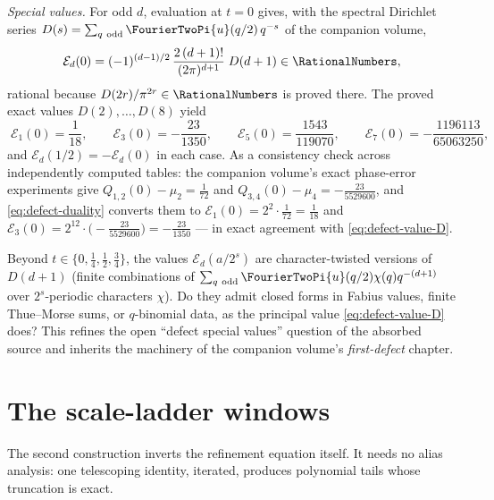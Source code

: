 \documentclass[11pt,oneside]{article}
\numberwithin{equation}{section}
\theoremstyle{definition}
\theoremstyle{remark}
\begin{document}
\emph{Special values.}  For odd $d$, evaluation at $t=0$ gives, with
the spectral Dirichlet series
$D(s)=\sum_{q\ \mathrm{odd}}\FourierTwoPi{u}(q/2)\,q^{-s}$ of the companion
volume,
\begin{equation}
 \mathcal E_d(0)
 =(-1)^{(d-1)/2}\,
 \frac{2\,(d+1)!}{(2\pi)^{d+1}}\;D(d+1)\in\RationalNumbers,
 \label{eq:defect-value-D}
\end{equation}
rational because $D(2r)/\pi^{2r}\in\RationalNumbers$ is proved there.  The proved
exact values $D(2),\dots,D(8)$ yield
\begin{equation}
 \boxed{\;
 \mathcal E_1(0)=\frac1{18},\qquad
 \mathcal E_3(0)=-\frac{23}{1350},\qquad
 \mathcal E_5(0)=\frac{1543}{119070},\qquad
 \mathcal E_7(0)=-\frac{1196113}{65063250},
 \;}
 \label{eq:defect-values}
\end{equation}
and $\mathcal E_d(1/2)=-\mathcal E_d(0)$ in each case.  As a
consistency check across independently computed tables: the companion
volume's exact phase-error experiments give
$Q_{1,2}(0)-\mu_2=\tfrac1{72}$ and
$Q_{3,4}(0)-\mu_4=-\tfrac{23}{5529600}$, and
\eqref{eq:defect-duality} converts them to
$\mathcal E_1(0)=2^{2}\cdot\tfrac1{72}=\tfrac1{18}$ and
$\mathcal E_3(0)=2^{12}\cdot\bigl(-\tfrac{23}{5529600}\bigr)
=-\tfrac{23}{1350}$ --- in exact agreement with
\eqref{eq:defect-value-D}.

\begin{question}
\label{q:defect-values}
Beyond $t\in\{0,\tfrac14,\tfrac12,\tfrac34\}$, the values
$\mathcal E_d(a/2^{s})$ are character-twisted versions of $D(d+1)$
(finite combinations of
$\sum_{q\ \mathrm{odd}}\FourierTwoPi{u}(q/2)\chi(q)q^{-(d+1)}$ over
$2^{s}$-periodic characters $\chi$).  Do they admit closed forms in
Fabius values, finite Thue--Morse sums, or $q$-binomial data, as the
principal value \eqref{eq:defect-value-D} does?  This refines the
open ``defect special values'' question of the absorbed source and
inherits the machinery of the companion volume's
\emph{first-defect} chapter.
\end{question}

\section{The scale-ladder windows}
\label{sec:ladder}

The second construction inverts the refinement equation itself.  It
needs no alias analysis: one telescoping identity, iterated, produces
polynomial tails whose truncation is exact.
\end{document}

